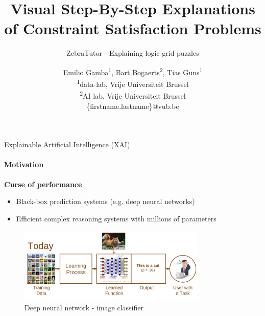 \documentclass{beamer}
\title{Visual Step-By-Step Explanations of Constraint Satisfaction Problems}
\subtitle{ZebraTutor - Explaining logic grid puzzles}
\author{Emilio Gamba\textsuperscript{1}, Bart Bogaerts\textsuperscript{2}, Tias Guns\textsuperscript{1}\\\tiny{\textsuperscript{1}data-lab, Vrije Universiteit Brussel}\\
\tiny{\textsuperscript{2}AI lab, Vrije Universiteit Brussel}\\
\tiny{\{firstname.lastname\}@vub.be}}
\date{}
\begin{document}
\frame{\maketitle

}
\begin{frame}{\small{Explainable Artificial Intelligence (XAI)}}
    \framesubtitle{Motivation}
    \textbf{Curse of performance}
    \begin{itemize}
        \item Black-box prediction systems (e.g. deep neural networks)
        \item Efficient complex reasoning systems with millions of parameters
    \end{itemize}

    \begin{figure}[]
        \centering
        \includegraphics[width=0.8\textwidth]{figures/cat}
        {\small \caption{Deep neural network - image classifier \textsuperscript{\cite{gunning2017explainable}}}}
        \label{catdog}
    \end{figure}

\end{frame}
\end{document}

